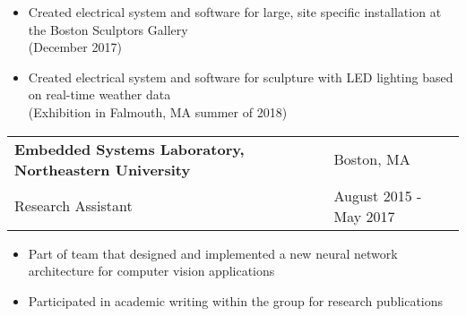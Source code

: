 \documentclass[11pt]{article}
\begin{document}
\vspace{-0.5cm}
\begin{itemize}[noitemsep]
\item
Created electrical system and software for large, site specific installation at the Boston Sculptors Gallery \\ (December 2017)
\item
Created electrical system and software for sculpture with LED lighting based on real-time weather data \\ (Exhibition in Falmouth, MA summer of 2018)
\end{itemize}
\vspace{0.25cm}
\begin{tabularx}{\textwidth}{l R}
{\bf Embedded Systems Laboratory, Northeastern University} & Boston, MA\\ 
Research Assistant & August 2015 - May 2017\\
\end{tabularx}  
\vspace{-0.5cm}
\begin{itemize}[noitemsep]
\item 
Part of team that designed and implemented a new neural network architecture for computer vision applications
\item
Participated in academic writing within the group for research publications 
\end{itemize}
\end{document}
